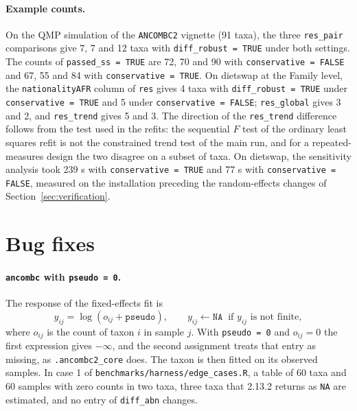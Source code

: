 \documentclass[11pt]{article}
\newcommand{\code}[1]{\texttt{#1}}
\begin{document}
\paragraph{Example counts.} On the QMP simulation of the \code{ANCOMBC2}
vignette (91 taxa), the three \code{res\_pair} comparisons give 7, 7 and 12
taxa with \code{diff\_robust = TRUE} under both settings. The counts of
\code{passed\_ss = TRUE} are 72, 70 and 90 with \code{conservative = FALSE} and
67, 55 and 84 with \code{conservative = TRUE}. On dietswap at the Family level,
the \code{nationalityAFR} column of \code{res} gives 4 taxa with
\code{diff\_robust = TRUE} under \code{conservative = TRUE} and 5 under
\code{conservative = FALSE}; \code{res\_global} gives 3 and 2, and
\code{res\_trend} gives 5 and 3. The direction of the \code{res\_trend}
difference follows from the test used in the refits: the sequential $F$ test of
the ordinary least squares refit is not the constrained trend test of the main
run, and for a repeated-measures design the two disagree on a subset of taxa.
On dietswap, the sensitivity analysis took 239 s with
\code{conservative = TRUE} and 77 s with \code{conservative = FALSE}, measured
on the installation preceding the random-effects changes of
Section~\ref{sec:verification}.

\section{Bug fixes}
\label{sec:bugs}

\paragraph{\code{ancombc} with \code{pseudo = 0}.} The response of the
fixed-effects fit is
\begin{equation}
y_{ij} = \log(o_{ij} + \texttt{pseudo}), \qquad
y_{ij} \leftarrow \texttt{NA} \ \text{ if } y_{ij} \text{ is not finite},
\end{equation}
where $o_{ij}$ is the count of taxon $i$ in sample $j$. With
\code{pseudo = 0} and $o_{ij} = 0$ the first expression gives $-\infty$, and
the second assignment treats that entry as missing, as \code{.ancombc2\_core}
does. The taxon is then fitted on its observed samples. In case 1 of
\code{benchmarks/harness/edge\_cases.R}, a table of 60 taxa and 60 samples with
zero counts in two taxa, three taxa that 2.13.2 returns as \code{NA} are
estimated, and no entry of \code{diff\_abn} changes.
\end{document}
